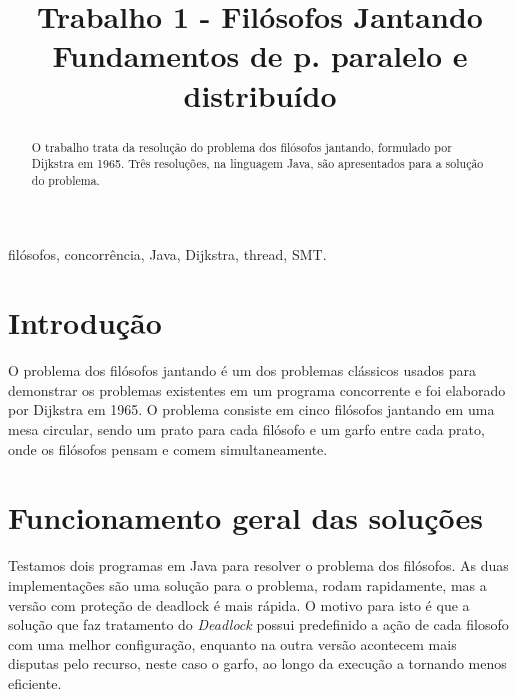 \documentclass[conference]{IEEEtran}
\begin{document}
\title{Trabalho 1 - Filósofos Jantando\\Fundamentos de p. paralelo e distribuído}

\author{
}

\maketitle

\begin{abstract}
O trabalho trata da resolução do problema dos filósofos jantando, formulado por Dijkstra em 1965.
Três resoluções, na linguagem Java, são apresentados para a solução do problema.
\end{abstract}

\begin{IEEEkeywords}
filósofos, concorrência, Java, Dijkstra, thread, SMT.
\end{IEEEkeywords}

\section*{Introdução}

O problema dos filósofos jantando é um dos problemas clássicos usados para demonstrar os problemas existentes em um programa concorrente e foi elaborado por Dijkstra em 1965.\cite{wikipedia_2022}
O problema consiste em cinco filósofos jantando em uma mesa circular, sendo um prato para cada filósofo e um garfo entre cada prato, onde os filósofos pensam e comem simultaneamente.
\cite{baeldung_java}

\section{Funcionamento geral das soluções}

Testamos dois programas em Java \cite{baeldung_java} para resolver o problema dos filósofos.
As duas implementações são uma solução para o problema, rodam rapidamente, mas a versão com proteção de deadlock é mais rápida.
O motivo para isto é que a solução que faz tratamento do \textit{Deadlock} possui predefinido a ação de cada filosofo com uma melhor configuração,
enquanto na outra versão acontecem mais disputas pelo recurso, neste caso o garfo, ao longo da execução a tornando menos eficiente.
\end{document}
